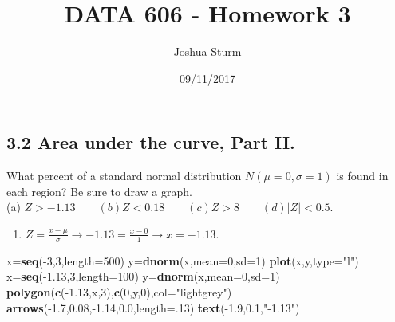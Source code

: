 \documentclass[]{article}
\title{DATA 606 - Homework 3}
\author{Joshua Sturm}
\date{09/11/2017}
\newenvironment{Shaded}{\begin{snugshade}}{\end{snugshade}}
\newcommand{\KeywordTok}[1]{\textcolor[rgb]{0.13,0.29,0.53}{\textbf{{#1}}}}
\newcommand{\DataTypeTok}[1]{\textcolor[rgb]{0.13,0.29,0.53}{{#1}}}
\newcommand{\DecValTok}[1]{\textcolor[rgb]{0.00,0.00,0.81}{{#1}}}
\newcommand{\FloatTok}[1]{\textcolor[rgb]{0.00,0.00,0.81}{{#1}}}
\newcommand{\StringTok}[1]{\textcolor[rgb]{0.31,0.60,0.02}{{#1}}}
\newcommand{\NormalTok}[1]{{#1}}
\providecommand{\tightlist}{%
  \setlength{\itemsep}{0pt}\setlength{\parskip}{0pt}}
\begin{document}
\maketitle

{
\setcounter{tocdepth}{2}
\tableofcontents
}
\subsection{3.2 Area under the curve, Part
II.}\label{area-under-the-curve-part-ii.}

What percent of a standard normal distribution
\(N(\mu = 0, \sigma = 1)\) is found in each region? Be sure to draw a
graph.\\
(a)
\(Z > -1.13 \qquad (b) Z < 0.18 \qquad (c) Z > 8 \qquad (d) |Z| < 0.5\).

\begin{enumerate}
\def\labelenumi{(\alph{enumi})}
\tightlist
\item
  \(Z = \frac{x-\mu}{\sigma} \to -1.13 = \frac{x-0}{1} \to x = -1.13.\)
\end{enumerate}

\begin{Shaded}
\begin{Highlighting}[]
\NormalTok{x=}\KeywordTok{seq}\NormalTok{(-}\DecValTok{3}\NormalTok{,}\DecValTok{3}\NormalTok{,}\DataTypeTok{length=}\DecValTok{500}\NormalTok{)}
\NormalTok{y=}\KeywordTok{dnorm}\NormalTok{(x,}\DataTypeTok{mean=}\DecValTok{0}\NormalTok{,}\DataTypeTok{sd=}\DecValTok{1}\NormalTok{)}
\KeywordTok{plot}\NormalTok{(x,y,}\DataTypeTok{type=}\StringTok{"l"}\NormalTok{)}
\NormalTok{x=}\KeywordTok{seq}\NormalTok{(-}\FloatTok{1.13}\NormalTok{,}\DecValTok{3}\NormalTok{,}\DataTypeTok{length=}\DecValTok{100}\NormalTok{)}
\NormalTok{y=}\KeywordTok{dnorm}\NormalTok{(x,}\DataTypeTok{mean=}\DecValTok{0}\NormalTok{,}\DataTypeTok{sd=}\DecValTok{1}\NormalTok{)}
\KeywordTok{polygon}\NormalTok{(}\KeywordTok{c}\NormalTok{(-}\FloatTok{1.13}\NormalTok{,x,}\DecValTok{3}\NormalTok{),}\KeywordTok{c}\NormalTok{(}\DecValTok{0}\NormalTok{,y,}\DecValTok{0}\NormalTok{),}\DataTypeTok{col=}\StringTok{"lightgrey"}\NormalTok{)}
\KeywordTok{arrows}\NormalTok{(-}\FloatTok{1.7}\NormalTok{,}\FloatTok{0.08}\NormalTok{,-}\FloatTok{1.14}\NormalTok{,}\FloatTok{0.0}\NormalTok{,}\DataTypeTok{length=}\NormalTok{.}\DecValTok{13}\NormalTok{)}
\KeywordTok{text}\NormalTok{(-}\FloatTok{1.9}\NormalTok{,}\FloatTok{0.1}\NormalTok{,}\StringTok{"-1.13"}\NormalTok{)}
\end{Highlighting}
\end{Shaded}
\end{document}
